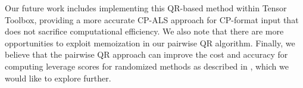 \documentclass{article}
\begin{document}
Our future work includes implementing this QR-based method within Tensor Toolbox, providing a more accurate CP-ALS approach for CP-format input that does not sacrifice computational efficiency.
We also note that there are more opportunities to exploit memoization in our pairwise QR algorithm.
Finally, we believe that the pairwise QR approach can improve the cost and accuracy for computing leverage scores for randomized methods as described in \cite{bharadwaj2023fast}, which we would like to explore further.



\end{document}
